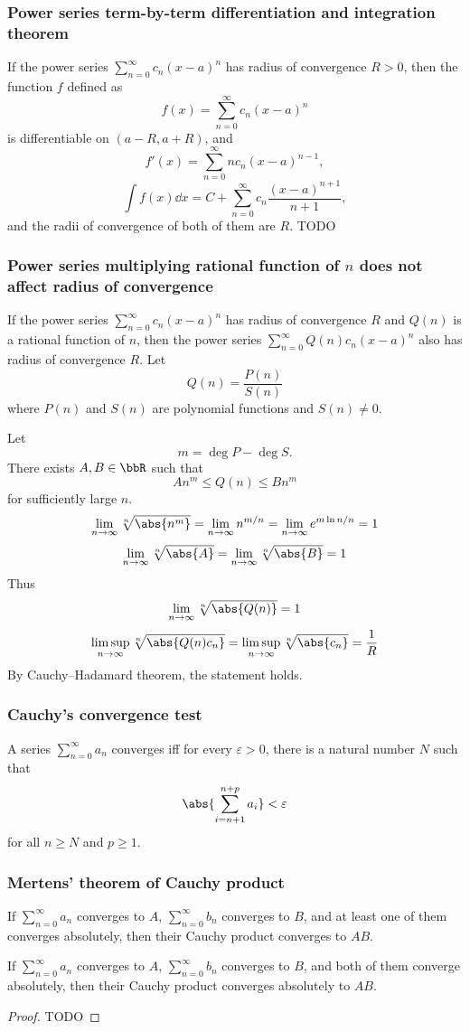 \documentclass[a4paper,12pt]{report}
\begin{document}
\begin{itemize}
\begin{itemize}
\subsubsection{Power series term-by-term differentiation and integration theorem}
If the power series $\sum_{n=0}^{\infty}c_n(x-a)^n$ has radius of convergence $R>0$, then the function $f$ defined as
\[f(x)=\sum_{n=0}^{\infty}c_n(x-a)^n\]
is differentiable on $(a-R,a+R)$, and
\[f'(x)=\sum_{n=0}^{\infty}nc_n(x-a)^{n-1},\]
\[\int f(x)\dd{x}=C+\sum_{n=0}^{\infty}c_n\frac{(x-a)^{n+1}}{n+1},\]
and the radii of convergence of both of them are $R$.
\bpr
TODO
\epr
\subsubsection{Power series multiplying rational function of $n$ does not affect radius of convergence}
If the power series $\sum_{n=0}^{\infty}c_n(x-a)^n$ has radius of convergence $R$ and $Q(n)$ is a rational function of $n$, then the power series $\sum_{n=0}^{\infty}Q(n)c_n(x-a)^n$ also has radius of convergence $R$.
\bpr
Let
\[Q(n)=\frac{P(n)}{S(n)}\]
where $P(n)$ and $S(n)$ are polynomial functions and $S(n)\ne0$.

Let
\[m=\deg P-\deg S.\]
There exists $A, B\in\bbR$ such that
\[An^m\le Q(n)\le Bn^m\]
for sufficiently large $n$.
\[\lim_{n\to\infty}\sqrt[n]{\abs{n^m}}=\lim_{n\to\infty}n^{m/n}=\lim_{n\to\infty}e^{m\ln n/n}=1\]
\[\lim_{n\to\infty}\sqrt[n]{\abs{A}}=\lim_{n\to\infty}\sqrt[n]{\abs{B}}=1\]
Thus
\[\lim_{n\to\infty}\sqrt[n]{\abs{Q(n)}}=1\]
\[\limsup_{n\to\infty}\sqrt[n]{\abs{Q(n)c_n}}=\limsup_{n\to\infty}\sqrt[n]{\abs{c_n}}=\frac{1}{R}\]
By Cauchy–Hadamard theorem, the statement holds.
\epr
\subsubsection{Cauchy's convergence test}
A series $\sum_{n=0}^{\infty}a_n$ converges iff for every $\varepsilon>0$, there is a natural number $N$ such that
\[\abs{\sum_{i=n+1}^{n+p}a_i}<\varepsilon\]
for all $n\geq N$ and $p\geq 1$.
\subsubsection{Mertens' theorem of Cauchy product}
If $\sum_{n=0}^{\infty}a_n$ converges to $A$, $\sum_{n=0}^{\infty}b_n$ converges to $B$, and at least one of them converges absolutely, then their Cauchy product converges to $AB$.

If $\sum_{n=0}^{\infty}a_n$ converges to $A$, $\sum_{n=0}^{\infty}b_n$ converges to $B$, and both of them converge absolutely, then their Cauchy product converges absolutely to $AB$.
\begin{proof}
TODO
\end{proof}

\end{itemize}
\end{itemize}
\end{document}
